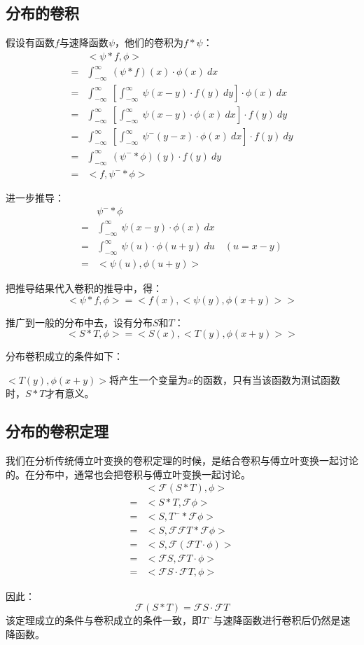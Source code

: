 \subsection{分布的卷积}
假设有函数$f$与速降函数$\psi$，他们的卷积为$f*\psi$：
\begin{align*}
	  & <\psi*f,\phi>                                                                                  \\
	= & \int_{-\infty}^{\infty}\ (\psi*f)(x)\cdot \phi(x)\ dx                                          \\
	= & \int_{-\infty}^{\infty}\ [\int_{-\infty}^{\infty}\ \psi(x-y)\cdot f(y)\ dy]\cdot \phi(x)\ dx   \\
	= & \int_{-\infty}^{\infty}\ [\int_{-\infty}^{\infty}\ \psi(x-y)\cdot \phi(x)\ dx]\cdot f(y)\ dy   \\
	= & \int_{-\infty}^{\infty}\ [\int_{-\infty}^{\infty}\ \psi^-(y-x)\cdot \phi(x)\ dx]\cdot f(y)\ dy \\
	= & \int_{-\infty}^{\infty}\ (\psi^-*\phi)(y)\cdot f(y)\ dy                                        \\
	= & <f,\psi^-*\phi>
\end{align*}

进一步推导：
\begin{align*}
	  & \psi^-*\phi                                                       \\
	= & \int_{-\infty}^{\infty}\ \psi(x-y)\cdot \phi(x)\ dx               \\
	= & \int_{-\infty}^{\infty}\ \psi(u)\cdot \phi(u+y)\ du \quad (u=x-y) \\
	= & <\psi(u),\phi(u+y)>
\end{align*}

把推导结果代入卷积的推导中，得：
$$
	<\psi*f,\phi>=<f(x),<\psi(y),\phi(x+y)>>
$$

推广到一般的分布中去，设有分布$S$和$T$：
\begin{equation}
	<S*T,\phi>=<S(x),<T(y),\phi(x+y)>>
\end{equation}

分布卷积成立的条件如下：

$<T(y),\phi(x+y)>$将产生一个变量为$x$的函数，只有当该函数为测试函数时，$S*T$才有意义。
\subsection{分布的卷积定理}
我们在分析传统傅立叶变换的卷积定理的时候，是结合卷积与傅立叶变换一起讨论的。在分布中，通常也会把卷积与傅立叶变换一起讨论。
\begin{align*}
	  & <\mathcal{F}(S*T),\phi>                     \\
	= & <S*T,\mathcal{F}\phi>                       \\
	= & <S,T^-*\mathcal{F}\phi>                     \\
	= & <S,\mathcal{F}\mathcal{F}T*\mathcal{F}\phi> \\
	= & <S,\mathcal{F}(\mathcal{F}T\cdot \phi)>     \\
	= & <\mathcal{F}S,\mathcal{F}T\cdot \phi>       \\
	= & <\mathcal{F}S\cdot \mathcal{F}T,\phi>
\end{align*}

因此：
\begin{equation}
	\mathcal{F}(S*T)=\mathcal{F}S\cdot \mathcal{F}T
\end{equation}
该定理成立的条件与卷积成立的条件一致，即$T^−$与速降函数进行卷积后仍然是速降函数。